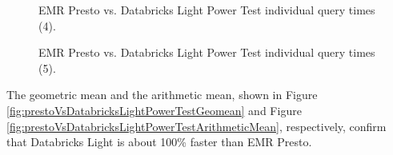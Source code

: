 \begin{figure}
   \begin{center}
   \end{center}
   \caption{EMR Presto vs. Databricks Light Power Test individual query times (4).}
   \label{fig:prestoVsDatabricksLightPowerTestIndividualQueries4}
\end{figure}

\begin{figure}
   \begin{center}
   \end{center}
   \caption{EMR Presto vs. Databricks Light Power Test individual query times (5).}
   \label{fig:prestoVsDatabricksLightPowerTestIndividualQueries5}
\end{figure}

The geometric mean and the arithmetic mean, shown in Figure \ref{fig:prestoVsDatabricksLightPowerTestGeomean} and Figure \ref{fig:prestoVsDatabricksLightPowerTestArithmeticMean}, respectively, confirm that Databricks Light is about 100\% faster than EMR Presto.

